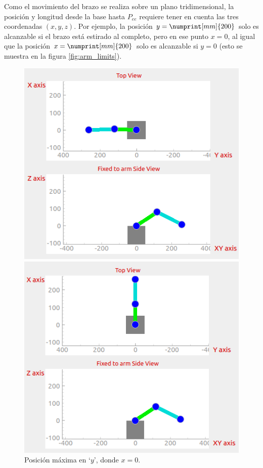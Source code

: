 Como el movimiento del brazo se realiza sobre un plano tridimensional, la posición y
longitud desde la base hasta $P_{ee}$ requiere tener en cuenta las tres coordenadas
$\left(x, y, z\right)$. Por ejemplo, la posición $y = \numprint[mm]{200}$ solo es
alcanzable si el brazo está estirado al completo, pero en ese punto $x = 0$, al igual
que la posición $x = \numprint[mm]{200}$ solo es alcanzable si $y = 0$ (esto se muestra
en la figura \ref{fig:arm_limits}).

\begin{figure}[H]
    \begin{minipage}{.45\linewidth}
        \centering
        \includegraphics[width=\linewidth]{pictures/arm_y_max.png}
        \caption{Posición máxima en `$y$', donde $x = 0$.}
    \end{minipage}
    \hfill
    \begin{minipage}{.45\linewidth}
        \centering
        \includegraphics[width=\linewidth]{pictures/arm_x_max.png}

\end{minipage}
\end{figure}
